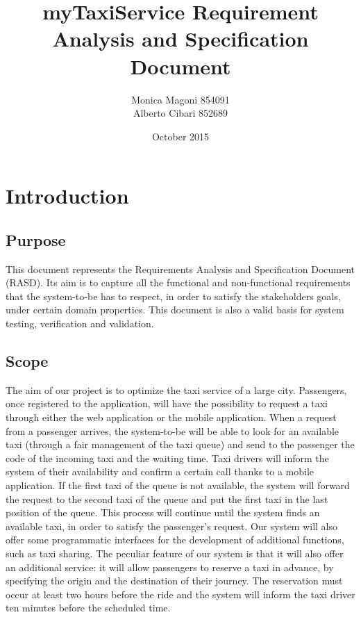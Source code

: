 \documentclass{article}
\title{
	\Huge{\textbf{myTaxiService}}
	\newline
	\huge{\textbf{R}equirement \textbf{A}nalysis and \textbf{S}pecification \textbf{D}ocument}
}
\author{
	Monica Magoni 854091
	\\
	Alberto Cibari 852689
}
\date{October 2015}
\begin{document}
	
	\begin{comment}
	    Pagina Titolo
	\end{comment}
	\maketitle
	
	
	\begin{comment}
    	Pagina Indici
	\end{comment}
	\newpage
	\renewcommand*\contentsname{\Huge{Summary}}
	\tableofcontents
	
\newpage
	
\section{Introduction}
	
	\subsection{Purpose}
    	This document represents the Requirements Analysis and Specification Document (RASD).
    	Its aim is to capture all the functional and non-functional requirements that the system-to-be has to respect, in order to satisfy the stakeholders goals, under certain domain properties. This document is also a valid basis for system testing, verification and validation.
	
	\subsection{Scope}
    	The aim of our project is to optimize the taxi service of a large city. 
    	Passengers, once registered to the application, will have the possibility to request a taxi through either the web application or the mobile application. When a request from a passenger arrives, the system-to-be will be able to look for an available taxi (through a fair management of the taxi queue) and send to the passenger the code of the incoming taxi and the waiting time. Taxi drivers will inform the system of their availability and confirm a certain call thanks to a mobile application.
    	\newline
    	If the first taxi of the queue is not available, the system will forward the request to the second taxi of the queue and put the first taxi in the last position of the queue. This process will continue until the system finds an available taxi, in order to satisfy the passenger's request.
    	\newline
    	Our system will also offer some programmatic interfaces for the development of additional functions, such as taxi sharing.
    	\newline
    	The peculiar feature of our system is that it will also offer an additional service: it will allow passengers to reserve a taxi in advance, by specifying the origin and the destination of their journey. The reservation must occur at least two hours before the ride and the system will inform the taxi driver ten minutes before the scheduled time.
	
\end{document}
